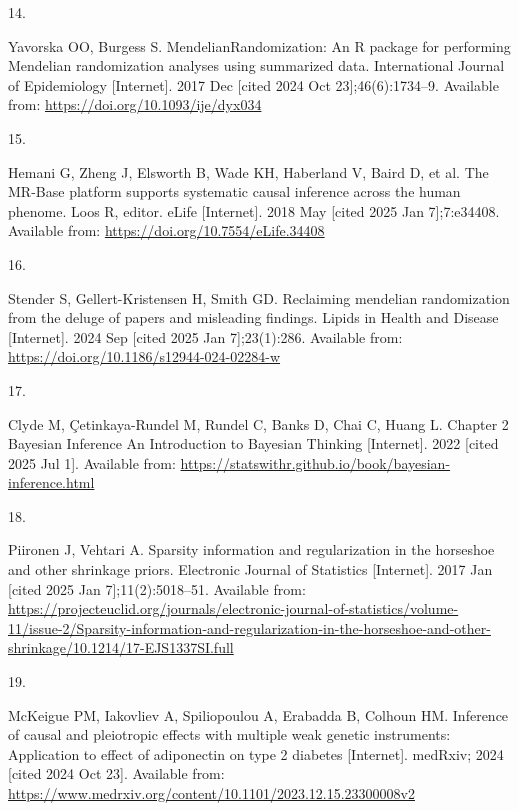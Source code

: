 \documentclass[
]{article}
\newlength{\cslhangindent}
\newlength{\csllabelwidth}
\newenvironment{CSLReferences}[2] %
 {\begin{list}{}{%
  \setlength{\itemindent}{0pt}
  \setlength{\leftmargin}{0pt}
  \setlength{\parsep}{0pt}
  \ifodd #1
   \setlength{\leftmargin}{\cslhangindent}
   \setlength{\itemindent}{-1\cslhangindent}
  \fi
  \setlength{\itemsep}{#2\baselineskip}}}
 {\end{list}}
\newcommand{\CSLLeftMargin}[1]{\parbox[t]{\csllabelwidth}{\strut#1\strut}}
\newcommand{\CSLRightInline}[1]{\parbox[t]{\linewidth - \csllabelwidth}{\strut#1\strut}}
\begin{document}
\begin{CSLReferences}{0}{1}
\CSLLeftMargin{14. }%
\CSLRightInline{Yavorska OO, Burgess S. {MendelianRandomization}: An {R} package for performing {Mendelian} randomization analyses using summarized data. International Journal of Epidemiology {[}Internet{]}. 2017 Dec {[}cited 2024 Oct 23{]};46(6):1734--9. Available from: \url{https://doi.org/10.1093/ije/dyx034}}

\CSLLeftMargin{15. }%
\CSLRightInline{Hemani G, Zheng J, Elsworth B, Wade KH, Haberland V, Baird D, et al. The {MR}-{Base} platform supports systematic causal inference across the human phenome. Loos R, editor. eLife {[}Internet{]}. 2018 May {[}cited 2025 Jan 7{]};7:e34408. Available from: \url{https://doi.org/10.7554/eLife.34408}}

\CSLLeftMargin{16. }%
\CSLRightInline{Stender S, Gellert-Kristensen H, Smith GD. Reclaiming mendelian randomization from the deluge of papers and misleading findings. Lipids in Health and Disease {[}Internet{]}. 2024 Sep {[}cited 2025 Jan 7{]};23(1):286. Available from: \url{https://doi.org/10.1186/s12944-024-02284-w}}

\CSLLeftMargin{17. }%
\CSLRightInline{Clyde M, Çetinkaya-Rundel M, Rundel C, Banks D, Chai C, Huang L. Chapter 2 {Bayesian} {Inference} {\textbar} {An} {Introduction} to {Bayesian} {Thinking} {[}Internet{]}. 2022 {[}cited 2025 Jul 1{]}. Available from: \url{https://statswithr.github.io/book/bayesian-inference.html}}

\CSLLeftMargin{18. }%
\CSLRightInline{Piironen J, Vehtari A. Sparsity information and regularization in the horseshoe and other shrinkage priors. Electronic Journal of Statistics {[}Internet{]}. 2017 Jan {[}cited 2025 Jan 7{]};11(2):5018--51. Available from: \url{https://projecteuclid.org/journals/electronic-journal-of-statistics/volume-11/issue-2/Sparsity-information-and-regularization-in-the-horseshoe-and-other-shrinkage/10.1214/17-EJS1337SI.full}}

\CSLLeftMargin{19. }%
\CSLRightInline{McKeigue PM, Iakovliev A, Spiliopoulou A, Erabadda B, Colhoun HM. Inference of causal and pleiotropic effects with multiple weak genetic instruments: Application to effect of adiponectin on type 2 diabetes {[}Internet{]}. medRxiv; 2024 {[}cited 2024 Oct 23{]}. Available from: \url{https://www.medrxiv.org/content/10.1101/2023.12.15.23300008v2}}


\end{CSLReferences}
\end{document}
